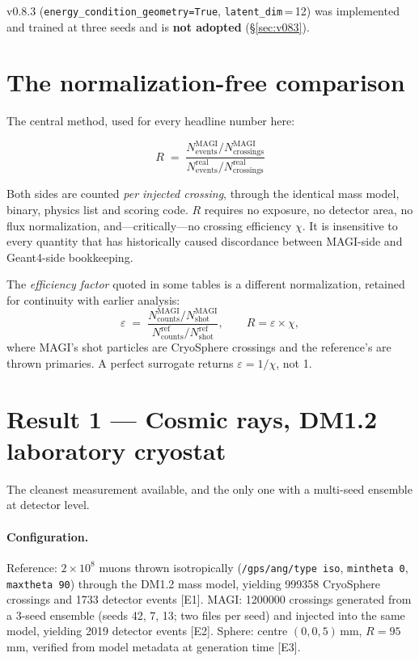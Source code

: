 \documentclass[11pt,a4paper]{article}
\newcommand{\ev}[1]{{\footnotesize\textcolor{prov}{[#1]}}}
\begin{document}
v0.8.3 (\texttt{energy\_condition\_geometry=True}, \texttt{latent\_dim}\,=\,12)
was implemented and trained at three seeds and is \textbf{not adopted}
(\S\ref{sec:v083}).

\section{The normalization-free comparison}

The central method, used for every headline number here:

\begin{equation}
R \;=\;
\frac{N^{\mathrm{MAGI}}_{\mathrm{events}} / N^{\mathrm{MAGI}}_{\mathrm{crossings}}}
     {N^{\mathrm{real}}_{\mathrm{events}} / N^{\mathrm{real}}_{\mathrm{crossings}}}
\end{equation}

Both sides are counted \emph{per injected crossing}, through the identical mass
model, binary, physics list and scoring code. $R$ requires no exposure, no
detector area, no flux normalization, and---critically---no crossing efficiency
$\chi$. It is insensitive to every quantity that has historically caused
discordance between MAGI-side and Geant4-side bookkeeping.

The \emph{efficiency factor} quoted in some tables is a different normalization,
retained for continuity with earlier analysis:
\begin{equation}
\varepsilon \;=\;
\frac{N^{\mathrm{MAGI}}_{\mathrm{counts}} / N^{\mathrm{MAGI}}_{\mathrm{shot}}}
     {N^{\mathrm{ref}}_{\mathrm{counts}} / N^{\mathrm{ref}}_{\mathrm{shot}}},
\qquad
R = \varepsilon \times \chi ,
\end{equation}
where MAGI's shot particles are CryoSphere crossings and the reference's are
thrown primaries. A perfect surrogate returns $\varepsilon = 1/\chi$, not 1.

\section{Result 1 --- Cosmic rays, DM1.2 laboratory cryostat}
\label{sec:dm12}

The cleanest measurement available, and the only one with a multi-seed ensemble
at detector level.

\paragraph{Configuration.}
Reference: $2\times10^{8}$ muons thrown isotropically
(\texttt{/gps/ang/type iso}, \texttt{mintheta 0}, \texttt{maxtheta 90}) through
the DM1.2 mass model, yielding \num{999358} CryoSphere crossings and
\num{1733} detector events \ev{E1}. MAGI: \num{1200000} crossings generated
from a 3-seed ensemble (seeds 42, 7, 13; two files per seed) and injected into
the same model, yielding \num{2019} detector events \ev{E2}.
Sphere: centre $(0,0,5)$\,mm, $R=95$\,mm, verified from model metadata at
generation time \ev{E3}.
\end{document}
